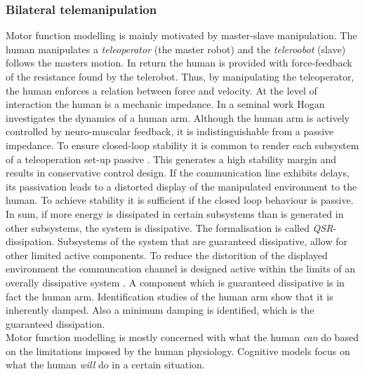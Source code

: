 \documentclass[a4paper,twoside, openright,12pt]{report}
\begin{document}
\subsubsection{Bilateral telemanipulation}
Motor function modelling is mainly motivated by master-slave manipulation. The human manipulates a \emph{teleoperator} (the master robot) and the \emph{teleroobot} (slave) follows the masters motion. In return the human is provided with force-feedback of the resistance found by the telerobot. Thus, by manipulating the teleoperator, the human enforces a relation between force and velocity. At the level of interaction the human is a mechanic impedance. In a seminal work Hogan \cite{Hogan1989} investigates the dynamics of a human arm. Although the human arm is actively controlled by neuro-muscular feedback, it is indistinguishable from a passive impedance. To ensure closed-loop stability it is common to render each subsystem of a teleoperation set-up passive \cite{Niemeyer2004}. This generates a high stability margin and results in conservative control design. If the communication line exhibits delays, its passivation leads to a distorted display of the manipulated environment to the human. To achieve stability it is sufficient if the closed loop behaviour is passive. In sum, if more energy is dissipated in certain subsystems than is generated in other subsystems, the system is dissipative. The formalisation is called \emph{QSR}-dissipation. Subsystems of the system that are guaranteed dissipative, allow for other limited active components. To reduce the distorition of the displayed environment the communcation channel is designed active within the limits of an overally dissipative system \cite{Hirche2012}. A component which is guaranteed  dissipative is in fact the human arm.  Identification studies \cite{Rahman1999} of the human arm show that it is inherently damped. Also a minimum damping is identified, which is the guaranteed dissipation.\\
Motor function modelling is mostly concerned with what the human \emph{can} do based on the limitations imposed by the human physiology. Cognitive models focus on what the human \emph{will} do in a certain situation.
\end{document}

